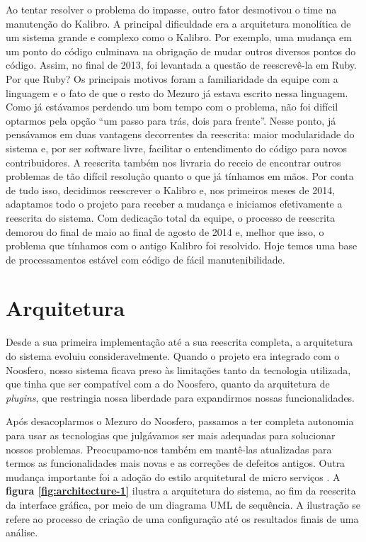 \documentclass{llncs}
\begin{document}
  Ao tentar resolver o problema do impasse, outro fator desmotivou o time na manutenção do Kalibro. A principal dificuldade era a arquitetura monolítica de um sistema grande e complexo como o Kalibro. Por exemplo, uma mudança em um ponto do código culminava na obrigação de mudar outros diversos pontos do código. Assim, no final de 2013, foi levantada a questão de reescrevê-la em Ruby. Por que Ruby? Os principais motivos foram a familiaridade da equipe com a linguagem e o fato de que o resto do Mezuro já estava escrito nessa linguagem.
  Como já estávamos perdendo um bom tempo com o problema, não foi difícil optarmos pela opção ``um passo para trás, dois para frente''. Nesse ponto, já pensávamos em duas vantagens decorrentes da reescrita: maior modularidade do sistema e, por ser software livre, facilitar o entendimento do código para novos contribuidores. A reescrita também nos livraria do receio de encontrar outros problemas de tão difícil resolução quanto o que já tínhamos em mãos. Por conta de tudo isso, decidimos reescrever o Kalibro e, nos primeiros meses de 2014, adaptamos todo o projeto para receber a mudança e iniciamos efetivamente a reescrita do sistema.
  Com dedicação total da equipe, o processo de reescrita demorou do final de maio ao final de agosto de 2014 e, melhor que isso, o problema que tínhamos com o antigo Kalibro foi resolvido. Hoje temos uma base de processamentos estável com código de fácil manutenibilidade.

\section{Arquitetura}
  Desde a sua primeira implementação até a sua reescrita completa, a arquitetura do sistema evoluiu consideravelmente. Quando o projeto era integrado com o Noosfero, nosso sistema ficava preso às limitações tanto da tecnologia utilizada, que tinha que ser compatível com a do Noosfero, quanto da arquitetura de \textit{plugins}, que restringia nossa liberdade para expandirmos nossas funcionalidades.

  Após desacoplarmos o Mezuro do Noosfero, passamos a ter completa autonomia para usar as tecnologias que julgávamos ser mais adequadas para solucionar nossos problemas. Preocupamo-nos também em mantê-las atualizadas para termos as funcionalidades mais novas e as correções de defeitos antigos. Outra mudança importante foi a adoção do estilo arquitetural de micro serviços \cite{namiot2014micro}. A \textbf{figura \ref{fig:architecture-1}} ilustra a arquitetura do sistema, ao fim da reescrita da interface gráfica, por meio de um diagrama UML de sequência. A ilustração se refere ao processo de criação de uma configuração até os resultados finais de uma análise.
\end{document}
